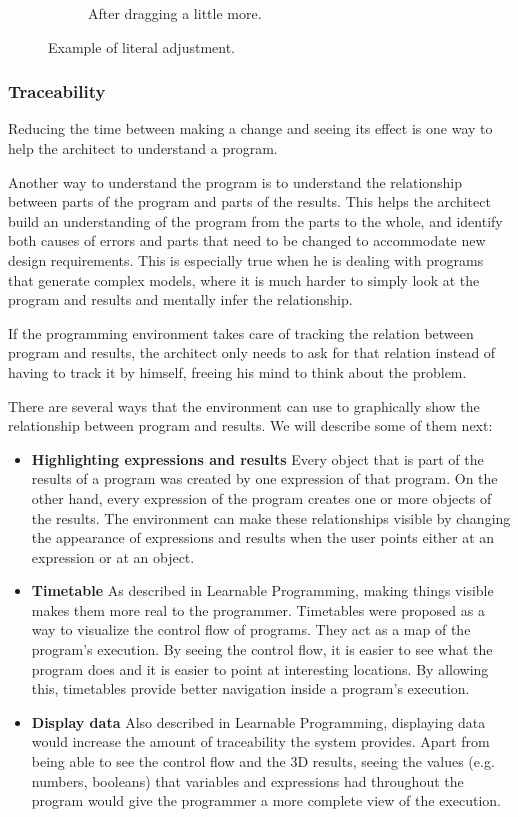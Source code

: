\begin{figure}
\begin{subfigure}[b]{0.32\linewidth}
    \caption{After dragging a little more.}
  \end{subfigure}
  \caption{Example of literal adjustment.}
  \label{fig:lit:adjust}
\end{figure}


\subsubsection{Traceability}
\label{sec:traceability}
Reducing the time between making a change and seeing its effect is one way to help the architect to understand a program.

Another way to understand the program is to understand the relationship between parts of the program and parts of the results.
This helps the architect build an understanding of the program from the parts to the whole, and identify both causes of errors and parts that need to be changed to accommodate new design requirements.
This is especially true when he is dealing with programs that generate complex models, where it is much harder to simply look at the program and results and mentally infer the relationship.

If the programming environment takes care of tracking the relation between program and results, the architect only needs to ask for that relation instead of having to track it by himself, freeing his mind to think about the problem.

There are several ways that the environment can use to graphically show the relationship between program and results.
We will describe some of them next:

\begin{itemize}
  \item {\bf Highlighting expressions and results} Every object that is part of the results of a program was created by one expression of that program.
  On the other hand, every expression of the program creates one or more objects of the results.
  The environment can make these relationships visible by changing the appearance of expressions and results when the user points either at an expression or at an object.

  \item {\bf Timetable} As described in Learnable Programming\cite{victor2012learnable}, making things visible makes them more real to the programmer.
  Timetables were proposed as a way to visualize the control flow of programs.
  They act as a map of the program's execution.
  By seeing the control flow, it is easier to see what the program does and it is easier to point at interesting locations.
  By allowing this, timetables provide better navigation inside a program's execution.

  \item {\bf Display data} Also described in Learnable Programming\cite{victor2012learnable}, displaying data would increase the amount of traceability the system provides.
  Apart from being able to see the control flow and the 3D results, seeing the values (e.g. numbers, booleans) that variables and expressions had throughout the program would give the programmer a more complete view of the execution.
\end{itemize}

